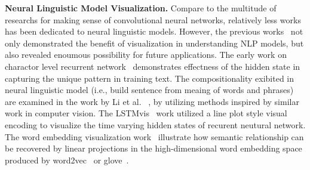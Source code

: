 
\noindent\textbf{Neural Linguistic Model Visualization.}
Compare to the multitude of researchs for making sense of convolutional neural networks, relatively less works has been dedicated to neural linguistic models.
%
However, the previous works~\cite{KarpathyJohnson2015, LiChenHovy2015, StrobeltGehrmannPfister2018, LiuBremerJayaraman2018} not only demonstrated the benefit of visualization in understanding NLP models, but also revealed enoumous possibility for future applications.
The early work on charactor level recurrent network~\cite{KarpathyJohnson2015} demonstrates effectness of the hidden state in capturing the unique pattern in training text. The compositionality exibited in neural linguistic model (i.e., build sentence from meaing of words and phrases) are examined in the work by Li et al. ~\cite{LiChenHovy2015}, by utilizing methods inspired by similar work in computer vision.
The LSTMvis~\cite{StrobeltGehrmannPfister2018} work utilized a line plot style visual encoding to visualize the time varying hidden states of recurent neutural network. The word embedding visualization work~\cite{LiuBremerJayaraman2018} illustrate how semantic relationship can be recovered by linear projections in the high-dimensional word embedding space produced by word2vec~\cite{MikolovSutskeverChen2013} or glove~\cite{PenningtonSocherManning2014}.
